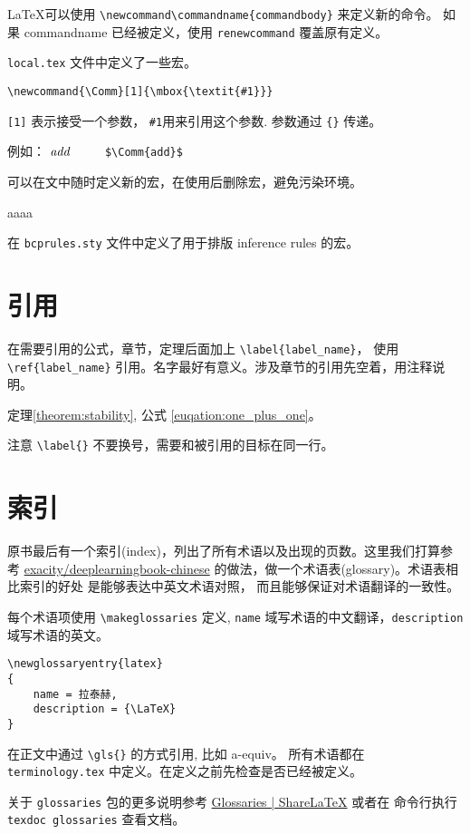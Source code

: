 \LaTeX 可以使用 \verb!\newcommand\commandname{commandbody}! 来定义新的命令。
如果 commandname 已经被定义，使用 \verb!renewcommand! 覆盖原有定义。

\texttt{local.tex} 文件中定义了一些宏。

\begin{verbatim}
\newcommand{\Comm}[1]{\mbox{\textit{#1}}}
\end{verbatim}

\texttt{[1]} 表示接受一个参数， \texttt{\#1}用来引用这个参数. 参数通过 \texttt{\{\}} 传递。

例如： $\Comm{add}$  $\qquad$ \vspace{1cm} \verb!$\Comm{add}$!

可以在文中随时定义新的宏，在使用后删除宏，避免污染环境。

\newcommand{\aaaa}{aaaa}
\aaaa
\let\aaaa\undefined

在 \texttt{bcprules.sty} 文件中定义了用于排版 inference rules 的宏。


\section{引用}

在需要引用的公式，章节，定理后面加上 \verb!\label{label_name}!， 使用 \verb!\ref{label_name}!
引用。名字最好有意义。涉及章节的引用先空着，用注释说明。

定理\ref{theorem:stability}, 公式 \ref{euqation:one_plus_one}。

注意 \verb!\label{}! 不要换号，需要和被引用的目标在同一行。

\section{索引}

原书最后有一个索引(index)，列出了所有术语以及出现的页数。这里我们打算参考
\href{https://github.com/exacity/deeplearningbook-chinese}
{exacity/deeplearningbook-chinese} 的做法，做一个术语表(glossary)。术语表相比索引的好处
是能够表达中英文术语对照， 而且能够保证对术语翻译的一致性。

每个术语项使用 \verb!\makeglossaries! 定义, \texttt{name} 域写术语的中文翻译，\texttt{description}
域写术语的英文。

\begin{verbatim}
\newglossaryentry{latex}
{
    name = 拉泰赫,
    description = {\LaTeX}
}
\end{verbatim}

在正文中通过 \verb!\gls{}! 的方式引用, 比如 \gls{a-equiv}。 所有术语都在 \texttt{terminology.tex}
中定义。在定义之前先检查是否已经被定义。

关于 \texttt{glossaries} 包的更多说明参考
\href{https://www.sharelatex.com/learn/Glossaries}{Glossaries | ShareLaTeX} 或者在
命令行执行 \texttt{texdoc glossaries} 查看文档。
